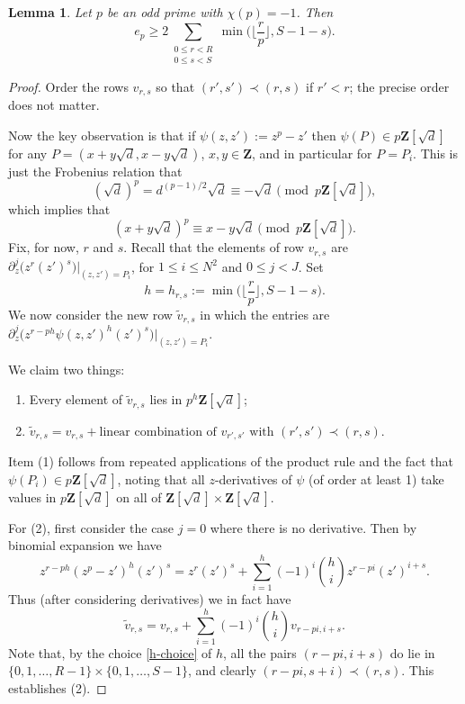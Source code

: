\documentclass[11pt,reqno]{amsart}
\numberwithin{equation}{section}
\newtheorem{lemma}[theorem]{Lemma}
\newcommand{\Z}{\mathbf{Z}}
\renewcommand{\le}{\leqslant}
\renewcommand{\ge}{\geqslant}
\begin{document}
\begin{lemma}\label{lem51} Let $p$ be an odd prime with $\chi(p) = -1$. Then
\[ e_p \ge 2\sum_{\substack{0 \le r < R \\ 0 \le s < S}} \min \big( \lfloor \frac{r}{p}\rfloor , S - 1 - s\big).\]
\end{lemma}
\begin{proof}
Order the rows $v_{r,s}$ so that $(r', s') \prec (r,s)$ if $r' < r$; the precise order does not matter.

Now the key observation is that if $\psi(z, z') := z^p - z'$ then $\psi(P) \in p \Z[\sqrt{d}]$ for any $P = (x + y \sqrt{d}, x - y \sqrt{d})$, $x, y \in \Z$, and in particular for $P = P_i$. This is just the Frobenius relation that 
\[ (\sqrt{d})^p = d^{(p-1)/2}\sqrt{d} \equiv -\sqrt{d} \pmod{p \Z[\sqrt{d}]},\] which implies that 
\[ (x + y \sqrt{d})^p \equiv x - y \sqrt{d} \pmod{p \Z[\sqrt{d}]}.\]
Fix, for now, $r$ and $s$. Recall that the elements of row $v_{r,s}$ are $\partial_z^j \big( z^r (z')^s\big)|_{(z,z') = P_i}$, for $1 \le i \le N^2$ and $0 \le j < J$. Set 
\begin{equation}\label{h-choice} h = h_{r,s} := \min \big( \lfloor \frac{r}{p}\rfloor , S - 1 - s\big).\end{equation}
We now consider the new row $\tilde v_{r,s}$ in which the entries are $\partial_z^j \big( z^{r - ph} \psi(z,z')^h (z')^s\big) |_{(z,z') = P_i}$.

We claim two things:
\begin{enumerate}
\item Every element of $\tilde v_{r,s}$ lies in $p^h \Z[\sqrt{d}]$;
\item $\tilde v_{r,s} = v_{r,s} + \mbox{linear combination of $v_{r',s'}$ with $(r', s') \prec (r,s)$}$.
\end{enumerate}
Item (1) follows from repeated applications of the product rule and the fact that $\psi(P_i) \in p \Z[\sqrt{d}]$, noting that all $z$-derivatives of $\psi$ (of order at least 1) take values in $p \Z[\sqrt{d}]$ on all of $\Z[\sqrt{d}] \times \Z[\sqrt{d}]$.

For (2), first consider the case $j = 0$ where there is no derivative. Then by binomial expansion we have
\[ z^{r - ph} (z^p - z')^h (z')^s = z^{r} (z')^s + \sum_{i = 1}^h (-1)^i\binom{h}{i} z^{r - p i} (z')^{i + s}.\]
Thus (after considering derivatives) we in fact have
\[ \tilde v_{r,s} = v_{r,s} + \sum_{i = 1}^h (-1)^i\binom{h}{i} v_{r - pi, i + s}.\]
Note that, by the choice \eqref{h-choice} of $h$, all the pairs $(r - pi, i + s)$ do lie in $\{0,1,\dots, R - 1\} \times \{0,1,\dots, S - 1\}$, and clearly $(r - pi , s + i) \prec (r, s)$. This establishes (2).


\end{proof}
\end{document}
